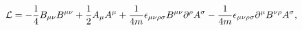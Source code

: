 \begin{equation}
\label{sym-Lag} {\cal L}=
-\frac{1}{4}B_{\mu\nu}B^{\mu\nu}+\frac{1}{2}A_\mu A^\mu
+\frac{1}{4m}\epsilon_{\mu\nu\rho\sigma}B^{\mu\nu}\partial^\rho
A^\sigma -\frac{1}{4m}\epsilon_{\mu\nu\rho\sigma}\partial^\mu
B^{\nu\rho} A^\sigma,
\end{equation}

